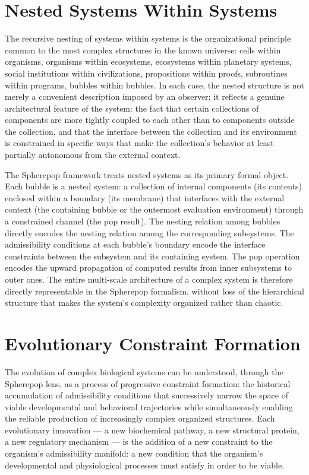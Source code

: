 \documentclass[12pt,openany]{book}
\theoremstyle{plain}
\theoremstyle{definition}
\theoremstyle{remark}
\begin{document}
\section{Nested Systems Within Systems}

The recursive nesting of systems within systems is the organizational principle common to the most complex structures in the known universe: cells within organisms, organisms within ecosystems, ecosystems within planetary systems, social institutions within civilizations, propositions within proofs, subroutines within programs, bubbles within bubbles. In each case, the nested structure is not merely a convenient description imposed by an observer; it reflects a genuine architectural feature of the system: the fact that certain collections of components are more tightly coupled to each other than to components outside the collection, and that the interface between the collection and its environment is constrained in specific ways that make the collection's behavior at least partially autonomous from the external context.

The Spherepop framework treats nested systems as its primary formal object. Each bubble is a nested system: a collection of internal components (its contents) enclosed within a boundary (its membrane) that interfaces with the external context (the containing bubble or the outermost evaluation environment) through a constrained channel (the pop result). The nesting relation among bubbles directly encodes the nesting relation among the corresponding subsystems. The admissibility conditions at each bubble's boundary encode the interface constraints between the subsystem and its containing system. The pop operation encodes the upward propagation of computed results from inner subsystems to outer ones. The entire multi-scale architecture of a complex system is therefore directly representable in the Spherepop formalism, without loss of the hierarchical structure that makes the system's complexity organized rather than chaotic.

\section{Evolutionary Constraint Formation}

The evolution of complex biological systems can be understood, through the Spherepop lens, as a process of progressive constraint formation: the historical accumulation of admissibility conditions that successively narrow the space of viable developmental and behavioral trajectories while simultaneously enabling the reliable production of increasingly complex organized structures. Each evolutionary innovation — a new biochemical pathway, a new structural protein, a new regulatory mechanism — is the addition of a new constraint to the organism's admissibility manifold: a new condition that the organism's developmental and physiological processes must satisfy in order to be viable.
\end{document}
